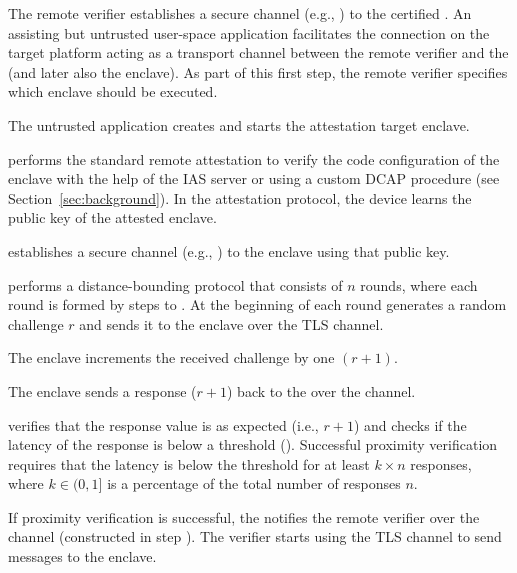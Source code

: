 \begin{mylist}
  \item[\one] The remote verifier establishes a secure channel (e.g., \tls) to the certified \device. An assisting but untrusted user-space application facilitates the connection on the target platform acting as a transport channel between the remote verifier and the \device (and later also the enclave). As part of this first step, the remote verifier specifies which enclave should be executed.

  \item[\two] The untrusted application creates and starts the attestation target enclave.

  \item[\three] \device performs the standard remote attestation to verify the code configuration of the enclave with the help of the IAS server or using a custom DCAP procedure (see Section~\ref{sec:background}). In the attestation protocol, the device learns the public key of the attested enclave.

  \item[\four] \device establishes a secure channel (e.g., \tls) to the enclave using that public key.

  \item[\five] \device performs a distance-bounding protocol that consists of $n$ rounds, where each round is formed by steps \five to \eight.
  At the beginning of each round \device generates a random challenge $r$ and sends it to the enclave over the TLS channel.

  \item[\six] The enclave increments the received challenge by one $(r+1)$.

  \item[\seven] The enclave sends a response ($r+1$) back to the \device over the \tls channel.

  \item[\eight] \device verifies that the response value is as expected (i.e., $r+1$) and checks if the latency of the response is below a threshold (\connect). Successful proximity verification requires that the latency is below the threshold for at least $k \times n$ responses, where $k \in (0, 1]$ is a percentage of the total number of responses $n$.

  \item[\nine] If proximity verification is successful, the \device notifies the remote verifier over the \tls channel (constructed in step \one). The verifier starts using the \device TLS channel to send messages to the enclave.
\end{mylist}


